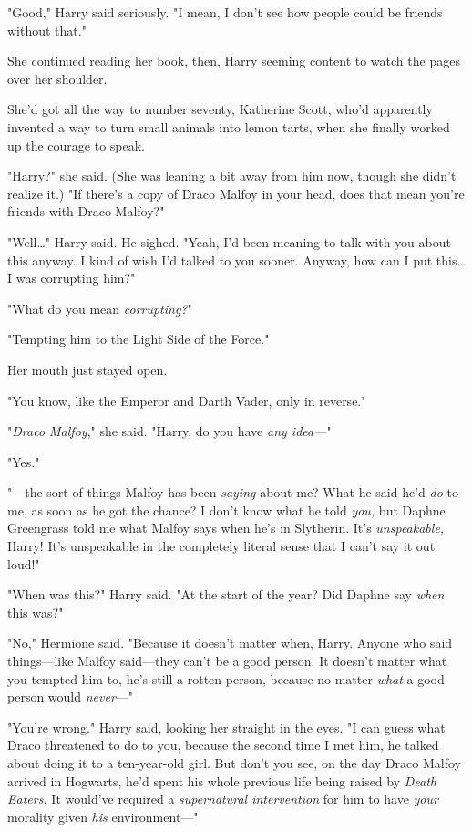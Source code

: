 "Good," Harry said seriously. "I mean, I don’t see how people could be friends
without that."

She continued reading her book, then, Harry seeming content to watch the pages
over her shoulder.

She’d got all the way to number seventy, Katherine Scott, who’d apparently
invented a way to turn small animals into lemon tarts, when she finally worked
up the courage to speak.

"Harry?" she said. (She was leaning a bit away from him now, though she didn’t
realize it.) "If there’s a copy of Draco Malfoy in your head, does that mean
you’re friends with Draco Malfoy?"

"Well…" Harry said. He sighed. "Yeah, I’d been meaning to talk with you
about this anyway. I kind of wish I’d talked to you sooner. Anyway, how can I
put this…I was corrupting him?"

"What do you mean \emph{corrupting?}"

"Tempting him to the Light Side of the Force."

Her mouth just stayed open.

"You know, like the Emperor and Darth Vader, only in reverse."

"\emph{Draco Malfoy}," she said. "Harry, do you have \emph{any idea—}"

"Yes."

"—the sort of things Malfoy has been \emph{saying} about me? What he said
he’d \emph{do} to me, as soon as he got the chance? I don’t know what he told
\emph{you,} but Daphne Greengrass told me what Malfoy says when he’s in
Slytherin. It’s \emph{unspeakable,} Harry! It’s unspeakable in the completely
literal sense that I can’t say it out loud!"

"When was this?" Harry said. "At the start of the year? Did Daphne say
\emph{when} this was?"

"No," Hermione said. "Because it doesn’t matter when, Harry. Anyone who said
things—like Malfoy said—they can’t be a good person. It doesn’t matter what
you tempted him to, he’s still a rotten person, because no matter \emph{what} a
good person would \emph{never}—"

"You’re wrong." Harry said, looking her straight in the eyes. "I can guess what
Draco threatened to do to you, because the second time I met him, he talked
about doing it to a ten-year-old girl. But don’t you see, on the day Draco
Malfoy arrived in Hogwarts, he’d spent his whole previous life being raised by
\emph{Death Eaters.} It would’ve required a \emph{supernatural intervention}
for him to have \emph{your} morality given \emph{his} environment—"

